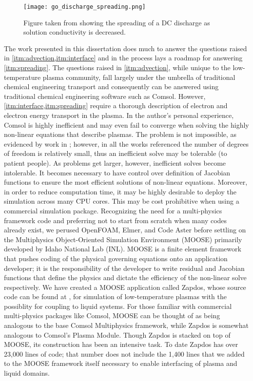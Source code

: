 \begin{figure}[htbp]
  \centering
  \texttt{[image: go\_discharge\_spreading.png]}
  \caption{Figure taken from \cite{rumbach2015solvation} showing the spreading of a DC discharge as solution conductivity is decreased.}
  \label{fig:go_spreading_1}
\end{figure}

The work presented in this dissertation does much to answer the questions raised in \cref{itm:advection,itm:interface} and in the process lays a roadmap for answering \cref{itm:spreading}. The questions raised in \cref{itm:advection}, while unique to the low-temperature plasma community, fall largely under the umbrella of traditional chemical engineering transport and consequently can be answered using traditional chemical engineering software such as Comsol. \cite{comsolSite} However, \cref{itm:interface,itm:spreading} require a thorough description of electron and electron energy transport in the plasma. In the author's personal experience, Comsol is highly inefficient and may even fail to converge when solving the highly non-linear equations that describe plasmas. The problem is not impossible, as evidenced by work in \cite{shirafuji2014numerical,sakiyama2007nonthermal,sakiyama2006finite}; however, in all the works referenced the number of degrees of freedom is relatively small, thus an inefficient solve may be tolerable (to patient people). As problems get larger, however, inefficient solves become intolerable. It becomes necessary to have control over definition of Jacobian functions to ensure the most efficient solutions of non-linear equations. Moreover, in order to reduce computation time, it may be highly desirable to deploy the simulation across many CPU cores. This may be cost prohibitive when using a commercial simulation package. Recognizing the need for a multi-physics framework code and preferring not to start from scratch when many codes already exist, we perused OpenFOAM\cite{foamSite}, Elmer\cite{elmerSite}, and Code Aster\cite{asterSite} before settling on the Multiphysics Object-Oriented Simulation Environment (MOOSE) primarily developed by Idaho National Lab (INL).\cite{mooseSite} MOOSE is a finite element framework that pushes coding of the physical governing equations onto an application developer; it is the responsibility of the developer to write residual and Jacobian functions that define the physics and dictate the efficiency of the non-linear solve respectively. We have created a MOOSE application called Zapdos, whose source code can be found at \cite{zapdosSite}, for simulation of low-temperature plasmas with the possiblity for coupling to liquid systems. For those familiar with commercial multi-physics packages like Comsol, MOOSE can be thought of as being analogous to the base Comsol Multiphysics framework, while Zapdos is somewhat analogous to Comsol's Plasma Module. Though Zapdos is stacked on top of MOOSE, its construction has been an intensive task. To date Zapdos has over 23,000 lines of code; that number does not include the 1,400 lines that we added to the MOOSE framework itself necessary to enable interfacing of plasma and liquid domains.

